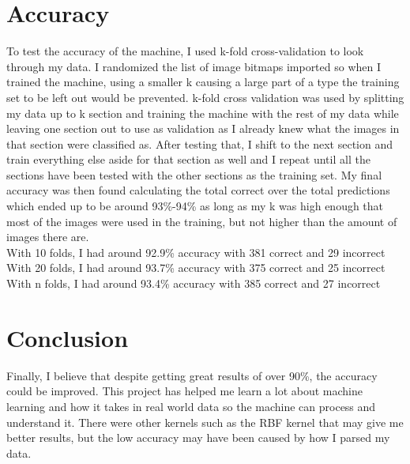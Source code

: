 \documentclass{article}
\begin{document}
\section{Accuracy}
To test the accuracy of the machine, I used k-fold cross-validation to look through my data. I randomized the list of image bitmaps imported so when I trained the machine, using a smaller k causing a large part of a type the training set to be left out would be prevented. k-fold cross validation was used by splitting my data up to k section and training the machine with the rest of my data while leaving one section out to use as validation as I already knew what the images in that section were classified as. After testing that, I shift to the next section and train everything else aside for that section as well and I repeat until all the sections have been tested with the other sections as the training set. My final accuracy was then found calculating the total correct over the total predictions which ended up to be around 93\%-94\% as long as my k was high enough that most of the images were used in the training, but not higher than the amount of images there are.
\\

\noindent
With 10 folds, I had around 92.9\% accuracy with 381 correct and 29 incorrect
With 20 folds, I had around 93.7\% accuracy with 375 correct and 25 incorrect
With n folds, I had around 93.4\% accuracy with 385 correct and 27 incorrect

\section{Conclusion}
Finally, I believe that despite getting great results of over 90\%, the accuracy could be improved. This project has helped me learn a lot about machine learning and how it takes in real world data so the machine can process and understand it. There were other kernels such as the RBF kernel that may give me better results, but the low accuracy may have been caused by how I parsed my data. 
\end{document}
